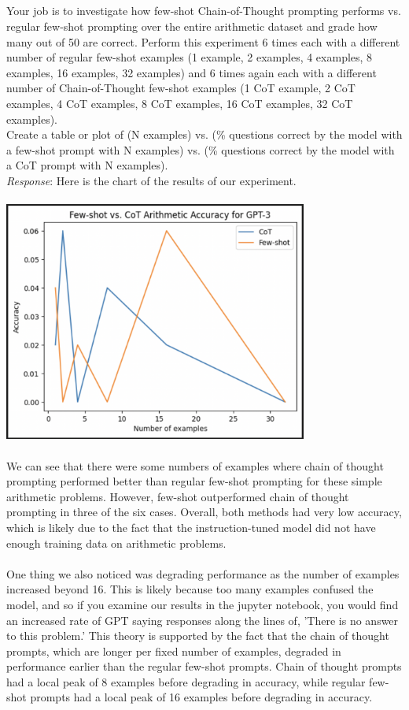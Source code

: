 \documentclass{article}
\begin{document}
\subsection{}
Your job is to investigate how few-shot Chain-of-Thought prompting performs vs. regular few-shot prompting over the entire arithmetic dataset and grade how many out of 50 are correct. Perform this experiment 6 times each with a different number of regular few-shot examples (1 example, 2 examples, 4 examples, 8 examples, 16 examples, 32 examples) and 6 times again each with a different number of Chain-of-Thought few-shot examples (1 CoT example, 2 CoT examples, 4 CoT examples, 8 CoT examples, 16 CoT examples, 32 CoT examples).
\\Create a table or plot of (N examples) vs. (\% questions correct by the model with a few-shot prompt with N examples) vs. (\% questions correct by the model with a CoT prompt with N examples).
\\ \emph{Response}: Here is the chart of the results of our experiment.\\\\
\includegraphics[width=0.75\textwidth]{chart}\\\\
We can see that there were some numbers of examples where chain of thought prompting performed better than regular few-shot prompting for these simple arithmetic problems. However, few-shot outperformed chain of thought prompting in three of the six cases. Overall, both methods had very low accuracy, which is likely due to the fact that the instruction-tuned model did not have enough training data on arithmetic problems.\\\\

One thing we also noticed was degrading performance as the number of examples increased beyond 16. This is likely because too many examples confused the model, and so if you examine our results in the jupyter notebook, you would find an increased rate of GPT saying responses along the lines of, 'There is no answer to this problem.' This theory is supported by the fact that the chain of thought prompts, which are longer per fixed number of examples, degraded in performance earlier than the regular few-shot prompts. Chain of thought prompts had a local peak of 8 examples before degrading in accuracy, while regular few-shot prompts had a local peak of 16 examples before degrading in accuracy.
\end{document}
